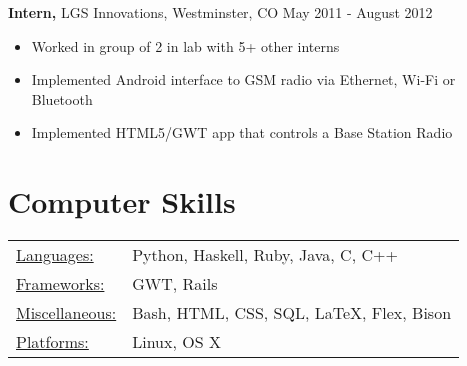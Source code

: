 \documentclass[12pt]{res}
\begin{document}
\begin{resume}
{\bf Intern,} LGS Innovations, Westminster, CO \hfill May 2011 - August 2012
\begin{itemize} \itemsep -2pt
    \item Worked in group of 2 in lab with 5+ other interns
    \item Implemented Android interface to GSM radio via Ethernet, Wi-Fi or Bluetooth
    \item Implemented HTML5/GWT app that controls a Base Station Radio
\end{itemize}

\section{Computer Skills}
\begin{tabular}{l p{4in}}
    \underline{Languages:} & Python, Haskell, Ruby, Java, C, C++ \\
    \underline{Frameworks:} & GWT, Rails \\
    \underline{Miscellaneous:} & Bash, HTML, CSS, SQL, \LaTeX, Flex, Bison \\
    \underline{Platforms:} & Linux, OS X
 \end{tabular}

\end{resume}
\end{document}
